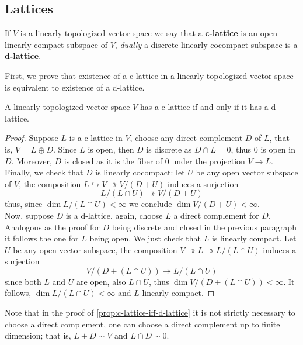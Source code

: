 \subsection*{Lattices}
\begin{definition}\label{def:c-lattice}
	If $V$ is a linearly topologized vector space we say that a \textbf{c-lattice} is an open linearly compact subspace of $V$, \textit{dually} a discrete linearly cocompact subspace is a \textbf{d-lattice}.
\end{definition}
First, we prove that existence of a c-lattice in a linearly topologized vector space is equivalent to existence of a d-lattice.
\begin{proposition}\label{prop:c-lattice-iff-d-lattice}
	A linearly topologized vector space $V$ has a c-lattice if and only if it has a d-lattice. 
\end{proposition}
\begin{proof}
	Suppose $L$ is a c-lattice in $V$, choose any direct complement $D$ of $L$, that is, $V = L \oplus D$. Since $L$ is open, then $D$ is discrete as $D\cap L = 0$, thus ${0}$ is open in $D$. Moreover, $D$ is closed as it is the fiber of $0$ under the projection $V \to L$. Finally, we check that $D$ is linearly cocompact: let $U$ be any open vector subspace of $V$, the composition $L \hookrightarrow V \twoheadrightarrow V/(D+U)$ induces a surjection 
	\[
		L/(L \cap U) \twoheadrightarrow V/(D+U)
	\]
	thus, since $\dim L / (L \cap U) < \infty$ we conclude $\dim V/(D+U) < \infty$. \\
	Now, suppose $D$ is a d-lattice, again, choose $L$ a direct complement for $D$. Analogous as the proof for $D$ being discrete and closed in the previous paragraph it follows the one for $L$ being open. We just check that $L$ is linearly compact. Let $U$ be any open vector subspace, the composition $V \twoheadrightarrow L \twoheadrightarrow L/(L \cap U)$ induces a surjection
	 \[
	 	V/(D + (L \cap U)) \twoheadrightarrow L/(L \cap U)
	 \]
	 since both $L$ and $U$ are open, also $L\cap U$, thus $\dim V/(D + (L \cap U)) < \infty$. It follows, $\dim L/(L \cap U) < \infty$ and $L$ linearly compact.  
\end{proof}
\begin{remark}\label{up-to-finite-dimension}
	Note that in the proof of \cref{prop:c-lattice-iff-d-lattice} it is not strictly necessary to choose a direct complement, one can choose a direct complement up to finite dimension; that is, $L + D \sim V$ and $L \cap D \sim 0$. 
\end{remark}
